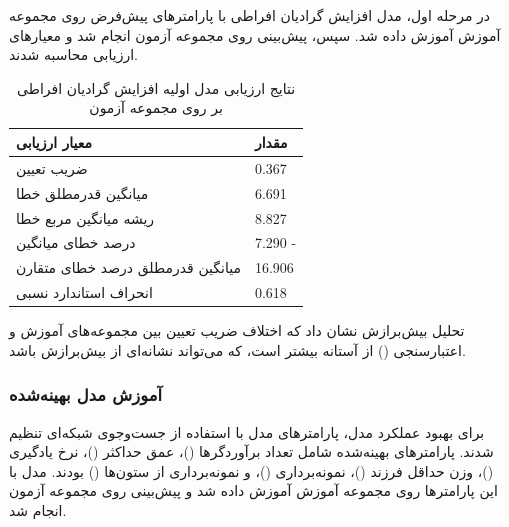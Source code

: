 در مرحله اول، مدل افزایش گرادیان افراطی با پارامترهای پیش‌فرض روی مجموعه آموزش آموزش داده شد. سپس، پیش‌بینی روی مجموعه آزمون انجام شد و معیارهای ارزیابی محاسبه شدند.

\vspace{0.3cm}
\begin{table}[H]
	\centering
	\caption{نتایج ارزیابی مدل اولیه افزایش گرادیان افراطی بر روی مجموعه آزمون}
	\renewcommand{\arraystretch}{1.3}
	\begin{tabular}{
			>{\centering\arraybackslash}m{4cm}
			>{\centering\arraybackslash}m{3cm}
		}
		\toprule
		\textbf{معیار ارزیابی} & \textbf{مقدار} \\
		\midrule
		ضریب تعیین & \num{0.367} \\
		میانگین قدرمطلق خطا & \num{6.691} \\
		ریشه میانگین مربع خطا & \num{8.827} \\
		درصد خطای میانگین & \num{7.290} - \\
		میانگین قدرمطلق درصد خطای متقارن & \num{16.906} \\
		انحراف استاندارد نسبی & \num{0.618} \\
		\bottomrule
	\end{tabular}
	\label{tab:xgboost_initial}
\end{table}
\vspace{0.5cm}

تحلیل بیش‌برازش نشان داد که اختلاف ضریب تعیین بین مجموعه‌های آموزش و اعتبارسنجی (\texttt{}) از آستانه \texttt{} بیشتر است، که می‌تواند نشانه‌ای از بیش‌برازش باشد.

\subsubsection{آموزش مدل بهینه‌شده}

برای بهبود عملکرد مدل، پارامترهای مدل با استفاده از جست‌وجوی شبکه‌ای تنظیم شدند. پارامترهای بهینه‌شده شامل تعداد برآوردگرها ()، عمق حداکثر ()، نرخ یادگیری ()، وزن حداقل فرزند ()، نمونه‌برداری ()، و نمونه‌برداری از ستون‌ها () بودند. مدل با این پارامترها روی مجموعه آموزش آموزش داده شد و پیش‌بینی روی مجموعه آزمون انجام شد.

